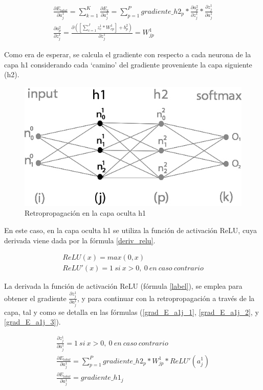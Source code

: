 \begin{gather}
	\frac{\partial E_{total}}{\partial a^1_j} = \sum_{k=1}^K \frac{\partial E_k}{\partial a^1_j} = \sum_{p=1}^P  gradiente\_h2_p * \frac{\partial a^2_p}{\partial z^1_j} * \frac{\partial z^1_j}{\partial a^1_j} \\
	\frac{\partial a^2_p}{\partial z^1_j} = \frac{\partial( [\sum_{c=1}^{J} z^1_c * W^1_{cp}] + b^2_p)}{\partial z^1_j} = W^1_{jp}
\end{gather}

Como era de esperar, se calcula el gradiente con respecto a cada neurona de la capa h1 considerando cada `camino' del gradiente proveniente la capa siguiente (h2).

\begin{figure}[H]
	\centering
	\includegraphics[scale=0.35]{imagenes/nn_2_capa_h1.jpg}  
	\caption{Retropropagación en la capa oculta h1}
\end{figure}

En este caso, en la capa oculta h1 se utiliza la función de activación ReLU, cuya derivada viene dada por la fórmula \ref{deriv_relu}. 

\begin{gather}
	ReLU(x) = max(0, x) \\
	ReLU'(x) = 1\ si\ x>0,\ 0\ en\ caso\ contrario
	\label{deriv_relu}
\end{gather}

La derivada la función de activación ReLU (fórmula \ref{label}), se emplea para obtener el gradiente $\frac{\partial z^1_ j}{\partial a^1_j}$, y para continuar con la retropropagación a través de la capa, tal y como se detalla en las fórmulas (\ref{grad_E_a1j_1}, \ref{grad_E_a1j_2}, y \ref{grad_E_a1j_3}).


\begin{gather}
	\frac{\partial z^1_ j}{\partial a^1_j} = 1\ si\ x>0,\ 0\ en\ caso\ contrario \label{grad_E_a1j_1} \\
	\frac{\partial E_{total}}{\partial a^1_j} = \sum_{p=1}^P  gradiente\_h2_p * W^1_{jp} * ReLU'(a^1_j) \label{grad_E_a1j_2} \\
	\frac{\partial E_{total}}{\partial a^1_j} = gradiente\_h1_j
	\label{grad_E_a1j_3}
\end{gather}

